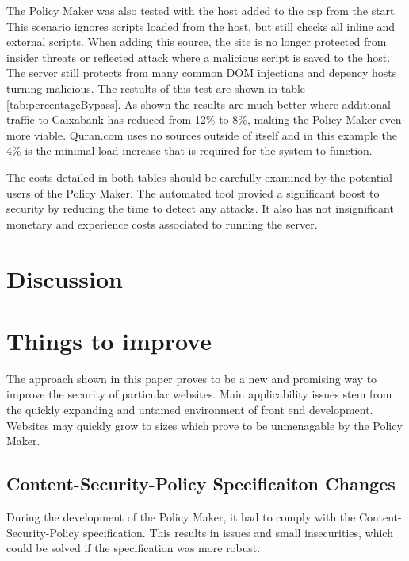 \begin{description}
The Policy Maker was also tested with the host added to the csp from the start.
This scenario ignores scripts loaded from the host, but still checks all inline and external scripts.
When adding this source, the site is no longer protected from insider threats or reflected attack where a malicious script is saved to the host.
The server still protects from many common DOM injections and depency hosts turning malicious.
The restults of this test are shown in table \ref{tab:percentageBypass}.
As shown the results are much better where additional traffic to Caixabank has reduced from 12\% to 8\%, making the Policy Maker even more viable.
Quran.com uses no sources outside of itself and in this example the 4\% is the minimal load increase that is required for the system to function.


The costs detailed in both tables should be carefully examined by the potential users of the Policy Maker.
The automated tool provied a significant boost to security by reducing the time to detect any attacks.
It also has not insignificant monetary and experience costs associated to running the server.

\section{Discussion}


\section{Things to improve}

The approach shown in this paper proves to be a new and promising way to improve the security of particular websites.
Main applicability issues stem from the quickly expanding and untamed environment of front end development.
Websites may quickly grow to sizes which prove to be unmenagable by the Policy Maker.

\subsection{Content-Security-Policy Specificaiton Changes}

During the development of the Policy Maker, it had to comply with the Content-Security-Policy specification.
This results in issues and small insecurities, which could be solved if the specification was more robust.


\end{description}
